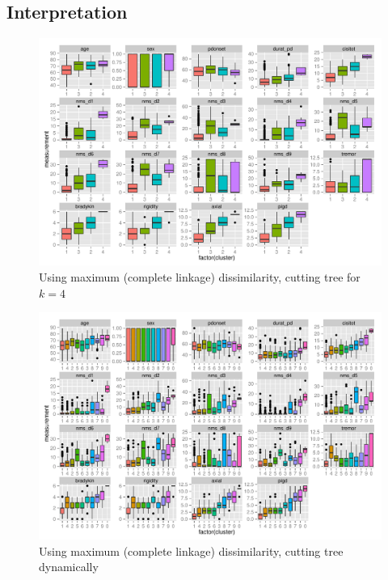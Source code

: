 \documentclass[letterpaper,12pt]{article}
\begin{document}
\subsection{Interpretation}

\begin{figure}[h]
  \centering
  \includegraphics[width=\linewidth]{hc-summaries-complete-k4.pdf}
  \caption{Using maximum (complete linkage) dissimilarity, cutting tree for $k = 4$}
  \label{fig:hc-summaries-complete-k4}
\end{figure}

\begin{figure}[h]
  \centering
  \includegraphics[width=\linewidth]{hc-summaries-complete-dynamic.pdf}
  \caption{Using maximum (complete linkage) dissimilarity, cutting tree
    dynamically}
  \label{fig:hc-summaries-complete-dynamic}
\end{figure}
\end{document}
